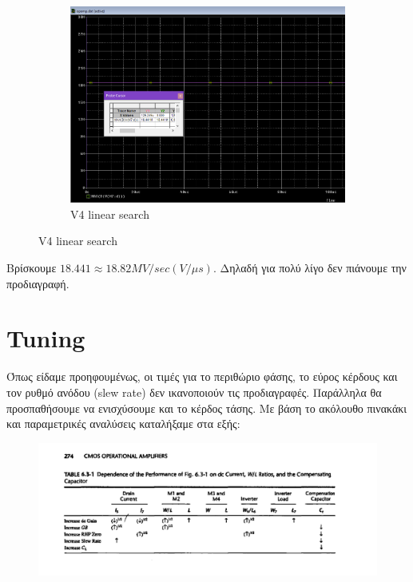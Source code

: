 \documentclass[12pt, a4paper]{article}
\begin{document}
\begin{figure}[h!]
\begin{subfigure}[b]{0.5\textwidth}
         \includegraphics[height=.4\textheight, width=\textwidth, keepaspectratio]{assets/slew_rate.png}
         \caption{V4 linear search} 
     \end{subfigure}
\end{figure}

Βρίσκουμε $18.441  \approx 18.82 MV/sec (V/μs)$. Δηλαδή για πολύ λίγο δεν πιάνουμε την προδιαγραφή.

\section{Tuning}

Όπως είδαμε προηφουμένως, οι τιμές για το περιθώριο φάσης, το εύρος κέρδους και τον ρυθμό ανόδου (slew rate) δεν ικανοποιούν τις προδιαγραφές. Παράλληλα θα προσπαθήσουμε να ενισχύσουμε και το κέρδος τάσης. Με βάση το ακόλουθο πινακάκι και παραμετρικές αναλύσεις καταλήξαμε στα εξής:

\begin{figure}[h!]
	\centering
	\includegraphics[width = \textwidth, height = .2\textheight, keepaspectratio]{assets/tuning_table.png}
\end{figure}
\end{document}
